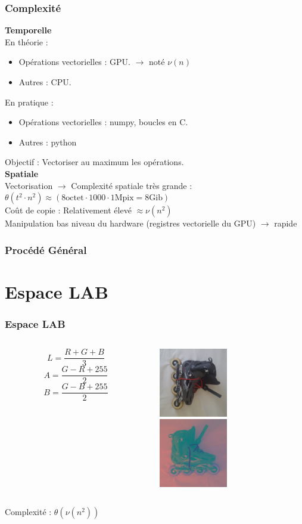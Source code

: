 \documentclass[french]{beamer}
\begin{document}
\begin{frame}
	\frametitle{Complexité}
	\textbf{Temporelle} \\
	\smallskip
	En théorie :
	\begin{itemize}
		\item Opérations vectorielles : GPU. \;\;\; $\longrightarrow$ noté $\nu(n)$
		\item Autres : CPU.
	\end{itemize}
	En pratique :
	\begin{itemize}
		\item Opérations vectorielles : numpy, boucles en C.
		\item Autres : python
	\end{itemize}
	Objectif : Vectoriser au maximum les opérations. \\
	\bigskip
	\textbf{Spatiale} \\
	\smallskip
	Vectorisation $\longrightarrow$ Complexité spatiale très grande :\\
	$\theta(t^2 \cdot n^2) \approx (8\text{octet} \cdot 1000 \cdot 1\text{Mpix} = 8 \text{Gib})$ \\
	\smallskip
	Coût de copie : Relativement élevé $\approx \nu(n^2)$\\
	Manipulation bas niveau du hardware (registres vectorielle du GPU) $\longrightarrow$ rapide
\end{frame}

\begin{frame}
	\frametitle{Procédé Général}
	\tableofcontents
\end{frame}

\section{Espace LAB}

\begin{frame}
	\frametitle{Espace LAB}
	\begin{columns}
		\begin{column}{5cm}
			$$L = \frac{R + G + B}{3}$$
			$$A = \frac{G - R + 255}{2}$$
			$$B = \frac{G - B + 255}{2}$$
		\end{column}
		\begin{column}{5cm}
			\includegraphics[width=3cm]{images/roller.png}\\
			\includegraphics[width=3cm]{images/roller_lab.jpg}
		\end{column}
	\end{columns}
	Complexité : $\theta(\nu(n^2))$
\end{frame}
\end{document}
